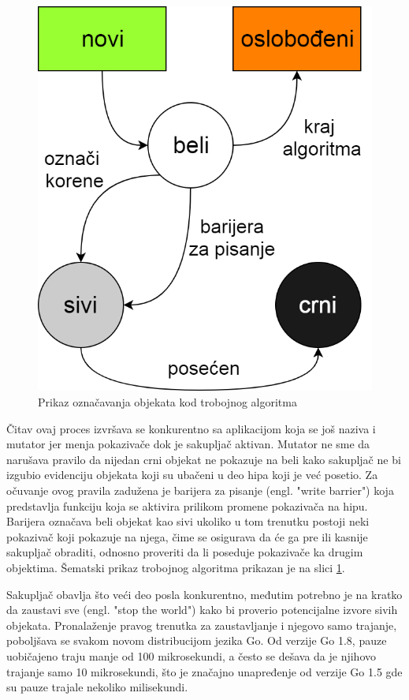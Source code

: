 \documentclass[12pt,oneside]{memoir}
\begin{document}
\begin{figure}
\begin{center}
\includegraphics[scale=0.33]{tricolor.png}
\end{center}
\caption{Prikaz označavanja objekata kod trobojnog algoritma}
\label{fig:tricolor}
\end{figure}

Čitav ovaj proces izvršava se konkurentno sa aplikacijom koja se još naziva i mutator jer menja pokazivače dok je sakupljač aktivan. Mutator ne sme da narušava pravilo da nijedan crni objekat ne pokazuje na beli kako sakupljač ne bi izgubio evidenciju objekata koji su ubačeni u deo hipa koji je već posetio. Za očuvanje ovog pravila zadužena je barijera za pisanje (engl. "write barrier") koja predstavlja funkciju koja se aktivira prilikom promene pokazivača na hipu. Barijera označava beli objekat kao sivi ukoliko u tom trenutku postoji neki pokazivač koji pokazuje na njega, čime se osigurava da će ga pre ili kasnije sakupljač obraditi, odnosno proveriti da li poseduje pokazivače ka drugim objektima. Šematski prikaz trobojnog algoritma prikazan je na slici \ref{fig:tricolor}.

Sakupljač obavlja što veći deo posla konkurentno, međutim potrebno je na kratko da zaustavi sve (engl. "stop the world") kako bi proverio potencijalne izvore sivih objekata. Pronalaženje pravog trenutka za zaustavljanje i njegovo samo trajanje, poboljšava se svakom novom distribucijom jezika Go. Od verzije Go 1.8, pauze uobičajeno traju manje od 100 mikrosekundi, a često se dešava da je njihovo trajanje samo 10 mikrosekundi, što je značajno unapređenje od verzije Go 1.5 gde su pauze trajale nekoliko milisekundi.
\end{document}
